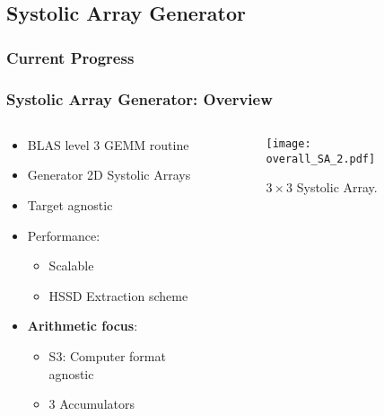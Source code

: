 \subsection{Systolic Array Generator}
\begin{frame}
    \frametitle{Current Progress}

    \tableofcontents[currentsection,
                     subsectionstyle=show/shaded/hide,
                     sectionstyle=show/hide]

\end{frame}

\begin{frame}
    \frametitle{Systolic Array Generator: Overview}

    \begin{columns}
        \begin{column}{0.5\textwidth}
            \begin{itemize}
                \item<1-> BLAS level 3 GEMM routine
                \item<1-> Generator 2D Systolic Arrays
                \item<1-> Target agnostic
                \item<2-> Performance:
                \begin{itemize}
		    \item Scalable
                    \item HSSD Extraction scheme
                \end{itemize}
		\item<3-> \textbf{Arithmetic focus}:
                \begin{itemize}
                    \item S3: Computer format agnostic
		    \item 3 Accumulators
                \end{itemize}
            \end{itemize}
        \end{column}

        \begin{column}{0.5\textwidth}
	    \begin{figure}[H]
            \centering
            \texttt{[image: overall\_SA\_2.pdf]}
            \caption{$3 \times 3$ Systolic Array.}
            \label{fig:overall_SA}
	    \end{figure}
        \end{column}
    \end{columns}
\end{frame}


